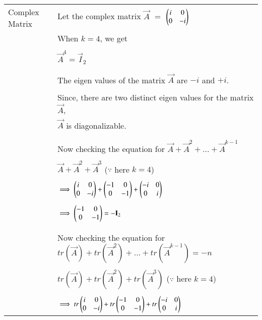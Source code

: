 	\begin{longtable}{|l|l|}
		\hline
		\multirow{3}{*}{Complex Matrix }   
		& \\ 
		& Let the complex matrix $\vec{A}$ $=$ $\begin{pmatrix}i&0 \\ 0&-i\end{pmatrix}$ \\ Example
		& \\
		& When $k = 4$, we get \\
		& \\
		& \qquad \qquad \qquad $\vec{A}^4 = \vec{I}_2$ \\
		& \\
		& \\
		& The eigen values of the matrix $\vec{A}$ are $-i$ and $+i$. \\
        & \\
        & Since, there are two distinct eigen values for the matrix $\vec{A}$,\\
        & $\vec{A}$ is diagonalizable. \\
        & \\
        & \\
        & Now checking the equation for $\vec{A}+\Vec{A}^2+...+\vec{A}^{k-1}$ \\
        & \\
        & \qquad \qquad \qquad $\vec{A}+\Vec{A}^2+\vec{A}^{3}$ \qquad ($\because$ here $k=4$) \\
        & \\
        & \qquad \qquad $\implies \begin{pmatrix}i&0 \\ 0&-i\end{pmatrix} + \begin{pmatrix}-1&0 \\ 0&-1\end{pmatrix} + \begin{pmatrix}-i&0 \\ 0&i\end{pmatrix}$ \\
        & \\
        & \qquad \qquad $\implies \begin{pmatrix}-1&0 \\ 0&-1\end{pmatrix} = -\mathbf{I}_2$  \\
        & \\
        & \\
        & Now checking the equation for $tr(\vec{A})+tr(\Vec{A}^2)+...+tr(\vec{A}^{k-1}) = -n$ \\
        & \\
        & \qquad \qquad \qquad $tr(\vec{A})+tr(\Vec{A}^2)+tr(\vec{A}^{3})$ \qquad ($\because$ here $k=4$) \\
        & \\
        & \qquad \qquad $\implies tr\begin{pmatrix}i&0 \\ 0&-i\end{pmatrix} + tr\begin{pmatrix}-1&0 \\ 0&-1\end{pmatrix} + tr\begin{pmatrix}-i&0 \\ 0&i\end{pmatrix}$ \\

\end{longtable}

